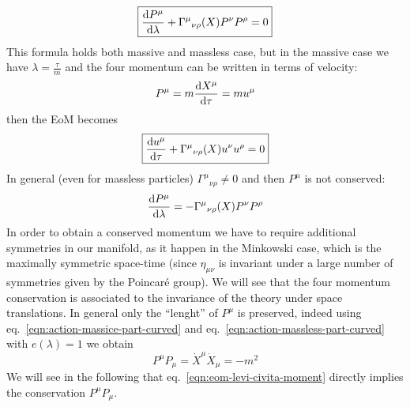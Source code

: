 \documentclass[../main/main.tex]{subfiles}
\begin{document}
\begin{equation}\label{eqn:eom-levi-civita-moment}
\boxed{
\frac{\textup{d} P^\mu}{\textup{d}\lambda}+{\Gamma^\mu}_{\nu\rho}(X)P^\nu P^\rho=0
}
\end{equation}
This formula holds both massive and massless case, but in the massive case we have $\lambda=\frac\tau m$  and the four momentum can be written in terms of velocity:
\[P^\mu=m\frac{\textup{d} X^\mu}{\textup{d}\tau}=m u^\mu\]
then the EoM becomes
\begin{equation}\label{eqn:eom-levi-civita-velocity}
\boxed{
\frac{\textup{d} u^\mu}{\textup{d}\tau}+{\Gamma^\mu}_{\nu\rho}(X)u^\nu u^\rho=0
}
\end{equation}
In general (even for massless particles) ${\Gamma^\mu}_{\nu\rho}\neq0$ and then $P^\mu$ is not conserved:
\[\frac{\textup{d} P^\mu}{\textup{d}\lambda}=-{\Gamma^\mu}_{\nu\rho}(X)P^\nu P^\rho\]
In order to obtain a conserved momentum we have to require additional symmetries in our manifold, as it happen in the Minkowski case, which is the maximally symmetric space-time (since $\eta_{\mu\nu}$ is invariant under a large number of symmetries given by the Poincaré group). 
We will see that the four momentum conservation is associated to the invariance of the theory under space translations. In general only the ``lenght'' of $P^\mu$ is preserved, indeed using eq.~\eqref{eqn:action-massice-part-curved} and eq.~\eqref{eqn:action-massless-part-curved} with $e(\lambda)=1$ we obtain
\[P^\mu P_\mu=\dot X^\mu\dot X_\mu=-m^2\]
We will see in the following that eq.~\eqref{eqn:eom-levi-civita-moment} directly implies the conservation $P^\mu P_\mu$.
\end{document}
